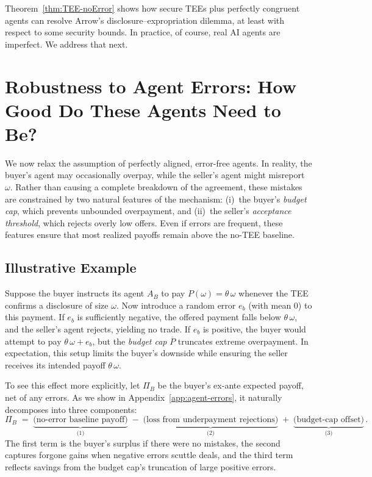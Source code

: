 \documentclass{article}
\begin{document}
Theorem~\ref{thm:TEE-noError} shows how secure TEEs plus perfectly congruent agents can
resolve Arrow’s disclosure–expropriation dilemma, at least with respect to some security bounds. In practice, of course, real AI agents are imperfect.  We address that next.

\section{Robustness to Agent Errors: How Good Do These Agents Need to Be?}
\label{sec:TEE-agents-errors}

We now relax the assumption of perfectly aligned, error-free agents. In reality, the buyer’s agent may occasionally overpay, while the seller’s agent might misreport $\omega$. Rather than causing a complete breakdown of the agreement, these mistakes are constrained by two natural features of the mechanism: (i)~the buyer’s \emph{budget cap}, which prevents unbounded overpayment, and (ii)~the seller’s \emph{acceptance threshold}, which rejects overly low offers. Even if errors are frequent, these features ensure that most realized payoffs remain above the no-TEE baseline.

\subsection*{Illustrative Example}
Suppose the buyer instructs its agent $A_B$ to pay $P(\omega) = \theta \,\omega$ whenever the TEE confirms a disclosure of size $\omega$. Now introduce a random error $e_b$ (with mean $0$) to this payment. If $e_b$ is sufficiently negative, the offered payment falls below $\theta \,\omega$, and the seller’s agent rejects, yielding no trade. If $e_b$ is positive, the buyer would attempt to pay $\theta \,\omega + e_b$, but the \emph{budget cap} $\overline{P}$ truncates extreme overpayment. In expectation, this setup limits the buyer’s downside while ensuring the seller receives its intended payoff $\theta \,\omega$.

\medskip

To see this effect more explicitly, let $\Pi_B$ be the buyer’s ex-ante expected payoff, net of any errors. As we show in Appendix~\ref{app:agent-errors}, it naturally decomposes into three components:
\begin{equation}\label{eq:buyer_decompose}
    \Pi_B
    \;=\;
    \underbrace{\text{(no-error baseline payoff)}}_{\text{(1)}}
    \;-\;
    \underbrace{\text{(loss from underpayment rejections)}}_{\text{(2)}}
    \;+\;
    \underbrace{\text{(budget-cap offset)}}_{\text{(3)}}
    \,.
\end{equation}
The first term is the buyer’s surplus if there were no mistakes, the second captures forgone gains when negative errors scuttle deals, and the third term reflects savings from the budget cap’s truncation of large positive errors.
\end{document}
